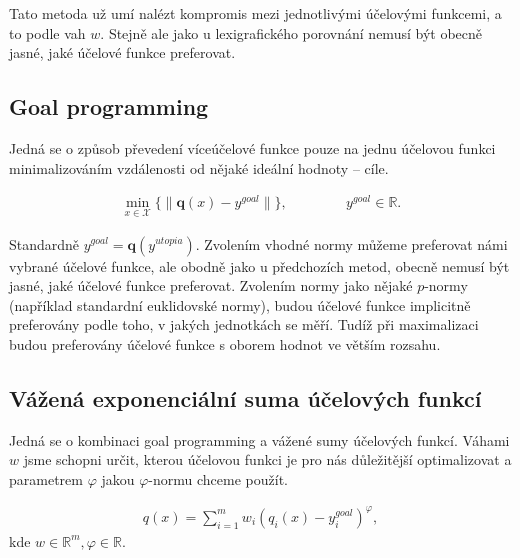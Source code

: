 Tato metoda už umí nalézt kompromis mezi jednotlivými účelovými funkcemi, a to podle vah $w$.
Stejně ale jako u lexigrafického porovnání nemusí být obecně jasné, jaké účelové funkce preferovat.

\subsection{Goal programming}\label{kap:goalP}

Jedná se o způsob převedení víceúčelové funkce pouze na jednu účelovou funkci minimalizováním vzdálenosti od nějaké ideální hodnoty -- cíle. 

\begin{definice}\label{df:goalP}
  \begin{align*}
    \min_{x \in \mathcal{X}} \{ \| \mathbf{q}(x) - y^{goal} \| \}, \hspace{50pt} y^{goal} \in \mathbb{R}.
  \end{align*}
\end{definice}

Standardně $y^{goal} = \mathbf{q}(y^{utopia})$.
Zvolením vhodné normy můžeme preferovat námi vybrané účelové funkce, ale obodně jako u předchozích metod, obecně nemusí být jasné, jaké účelové funkce preferovat.
Zvolením normy jako nějaké $p$-normy (například standardní euklidovské normy), budou účelové funkce implicitně preferovány podle toho,
v jakých jednotkách se měří. Tudíž při maximalizaci budou preferovány účelové funkce s oborem hodnot ve větším rozsahu.

\subsection{Vážená exponenciální suma účelových funkcí}\label{kap:vazenaSumUcF}

Jedná se o kombinaci goal programming a vážené sumy účelových funkcí.
Váhami $w$ jsme schopni určit, kterou účelovou funkci je pro nás důležitější optimalizovat a parametrem $\varphi$ jakou $\varphi$-normu chceme použít.

\begin{definice}\label{df:vazenaSumUcF}
  \begin{align*}
    q(x) = \sum_{i=1}^{m} w_i (q_i(x) - y_i^{goal})^\varphi,
  \end{align*}
  kde $w \in \mathbb{R}^m, \varphi \in \mathbb{R}$.
\end{definice}

